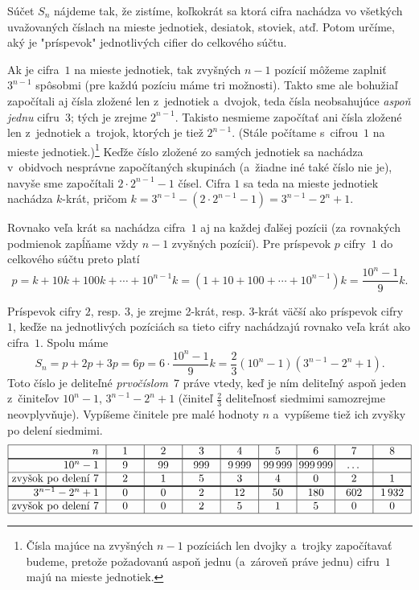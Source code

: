 {%
Súčet $S_n$ nájdeme tak, že zistíme, koľkokrát sa ktorá cifra nachádza vo všetkých uvažovaných číslach na mieste jednotiek, desiatok, stoviek, atď. Potom určíme, aký je "príspevok" jednotlivých cifier do celkového súčtu.

Ak je cifra~$1$ na mieste jednotiek, tak zvyšných $n-1$ pozícií môžeme zaplniť $3^{n-1}$ spôsobmi (pre každú pozíciu máme tri možnosti). Takto sme ale bohužiaľ započítali aj čísla zložené len z~jednotiek a~dvojok, teda čísla neobsahujúce {\it aspoň jednu} cifru~$3$; tých je zrejme $2^{n-1}$. Takisto nesmieme započítať ani čísla zložené len z~jednotiek a~trojok, ktorých je tiež $2^{n-1}$. (Stále počítame s~cifrou~$1$ na mieste jednotiek.)\footnote{Čísla majúce na zvyšných $n-1$ pozíciách len dvojky a~trojky započítavať budeme, pretože požadovanú aspoň jednu (a~zároveň práve jednu) cifru~$1$ majú na mieste jednotiek.}
Keďže číslo zložené zo samých jednotiek sa nachádza v~obidvoch nesprávne započítaných skupinách (a~žiadne iné také číslo nie je), navyše sme započítali $2\cdot2^{n-1}-1$ čísel. Cifra $1$ sa teda na mieste jednotiek nachádza $k$-krát, pričom $k=3^{n-1}-(2\cdot2^{n-1}-1)=3^{n-1}-2^n+1$.

Rovnako veľa krát sa nachádza cifra~$1$ aj na každej ďalšej pozícii (za rovnakých podmienok zapĺňame vždy $n-1$ zvyšných pozícií). Pre príspevok $p$ cifry~$1$ do celkového súčtu preto platí
$$
p=k+10k+100k+\cdots+10^{n-1}k=(1+10+100+\cdots+10^{n-1})k=\frac{10^n-1}9k.
$$

Príspevok cifry $2$, resp. $3$, je zrejme 2-krát, resp. 3-krát väčší ako príspevok cifry~$1$, keďže na jednotlivých pozíciách sa tieto cifry nachádzajú rovnako veľa krát ako cifra~$1$. Spolu máme
$$
S_n=p+2p+3p=6p=6\cdot\frac{10^n-1}9k=\frac23(10^n-1)(3^{n-1}-2^n+1).
$$
Toto číslo je deliteľné {\it prvočíslom}~$7$ práve vtedy, keď je ním deliteľný aspoň jeden z~činiteľov $10^n-1$, $3^{n-1}-2^n+1$ (činiteľ $\frac23$ deliteľnosť siedmimi samozrejme neovplyvňuje). Vypíšeme činitele pre malé hodnoty $n$ a~vypíšeme tiež ich zvyšky po delení siedmimi.
$$
\vbox{\offinterlineskip
       \halign{\strut\vrule\ \hfil # \vrule&&\hbox to 3.5em{\hss$#$\hss}\vrule\cr
\noalign{\hrule}
$n$                & 1 & 2 & 3 &  4 &  5 &  6 &   7 &   8 \cr
\noalign{\hrule height1pt}
$10^n-1$            & 9 & 99 & 999 & 9\,999 & 99\,999 & 999\,999 & \dots &  \cr
\noalign{\hrule}
zvyšok po delení 7    &2 & 1 & 5 & 3 &  4 &  0 &  2 &   1 \cr
\noalign{\hrule height1pt}
$3^{n-1}-2^n+1$          & 0 & 0 & 2 & 12 & 50 & 180 & 602 & 1\,932 \cr
\noalign{\hrule}
zvyšok po delení 7 & 0 &  0 &  2 &  5 &  1 &    5 &   0    &   0 \cr
\noalign{\hrule}
}}
$$

}
